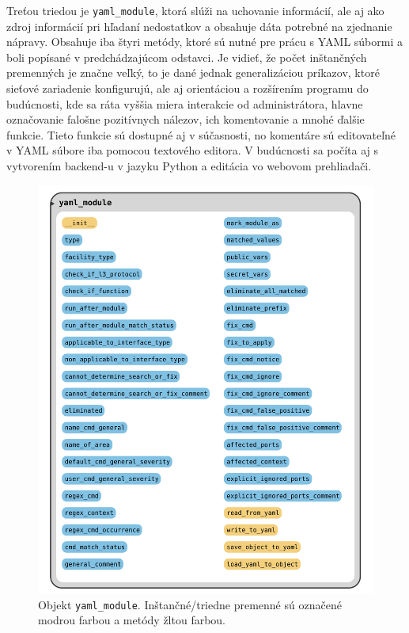 Treťou triedou je \texttt{yaml\_module}, ktorá slúži na uchovanie informácií, ale aj ako zdroj informácií pri hľadaní nedostatkov a obsahuje dáta potrebné na zjednanie nápravy. Obsahuje iba štyri metódy, ktoré sú nutné pre prácu s YAML súbormi a boli popísané v predchádzajúcom odstavci. Je vidieť, že počet inštančných premenných je značne veľký, to je dané jednak generalizáciou príkazov, ktoré sieťové zariadenie konfigurujú, ale aj orientáciou a rozšírením programu do budúcnosti, kde sa ráta vyššia miera interakcie od administrátora, hlavne označovanie falošne pozitívnych nálezov, ich komentovanie a mnohé ďalšie funkcie. Tieto funkcie sú dostupné aj v súčasnosti, no komentáre sú editovateľné v YAML súbore iba pomocou textového editora. V budúcnosti sa počíta aj s vytvorením backend-u v jazyku Python a editácia vo webovom prehliadači. 
\begin{figure}[H]
	\begin{center}
		\includegraphics[scale=0.55]{obrazky/yaml_module_class.pdf}
	\end{center}
	\caption[Objekt \texttt{yaml\_module}. Inštančné/triedne premenné sú označené modrou farbou a metódy žltou farbou.]{Objekt \texttt{yaml\_module}. Inštančné/triedne premenné sú označené modrou farbou a metódy žltou farbou.}
	\label{module_class}
\end{figure}


